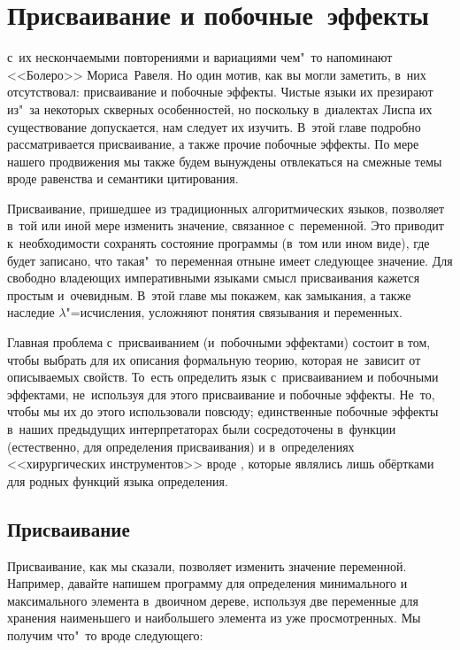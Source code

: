 \chapter{Присваивание и побочные~эффекты}\label{chapter:assignment}

 с~их нескончаемыми
повторениями и вариациями чем"~то напоминают <<Болеро>> Мориса~Равеля. Но один
мотив, как вы могли заметить, в~них отсутствовал: присваивание и побочные
эффекты. Чистые языки их презирают из"~за некоторых скверных особенностей, но
поскольку в~диалектах Лиспа их существование допускается, нам следует их
изучить. В~этой главе подробно рассматривается присваивание, а также прочие
побочные эффекты. По мере нашего продвижения мы также будем вынуждены
отвлекаться на смежные темы вроде равенства и семантики цитирования.

\bigskip

Присваивание, пришедшее из традиционных алгоритмических языков, позволяет
в~той или иной мере изменить значение, связанное с~переменной. Это приводит
к~необходимости сохранять состояние программы (в~том или ином виде), где будет
записано, что такая"~то переменная отныне имеет следующее значение. Для свободно
владеющих императивными языками смысл присваивания кажется простым и~очевидным.
В~этой главе мы покажем, как замыкания, а также наследие $\lambda$"=исчисления,
усложняют понятия связывания и переменных.

Главная проблема с~присваиванием (и~побочными эффектами) состоит в том, чтобы
выбрать для их описания формальную теорию, которая не~зависит от описываемых
свойств. То~есть определить язык с~присваиванием и побочными эффектами,
не~используя для этого присваивание и побочные эффекты. Не~то, чтобы мы их до
этого использовали повсюду; единственные побочные эффекты в~наших предыдущих
интерпретаторах были сосредоточены в~функции  (естественно, для
определения присваивания) и в~определениях <<хирургических инструментов>> вроде
, которые являлись лишь обёртками для родных функций языка
определения.


\section{Присваивание}\label{assignment/sect:assignment}

Присваивание, как мы сказали, позволяет изменить значение переменной. Например,
давайте напишем программу для определения минимального и максимального элемента
в~двоичном дереве, используя две переменные для хранения наименьшего и
наибольшего элемента из уже просмотренных. Мы получим что"~то вроде следующего:

